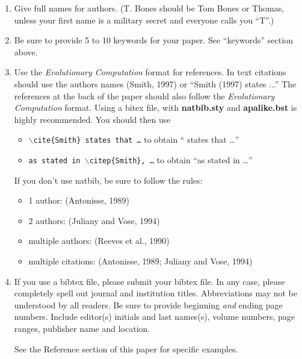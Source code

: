 \documentclass[twoside]{article}
\begin{document}
\begin{enumerate} 
    
\item
Give full names for authors.  (T. Bones should be Tom Bones or Thomas, 
unless your first name is a military secret and everyone calls you ``T''.)  

\item
Be sure to provide 5 to 10 keywords for your paper.  See ``keywords'' 
section above.

\item
Use the {\em Evolutionary Computation} format for references. In text 
citations should use the authors names (Smith, 1997) or ``Smith (1997) 
states ...''   The references at the back of the paper should also follow 
the {\em Evolutionary Computation} format. Using a bitex file, with
{\bf natbib.sty} and {\bf  apalike.bst}  is highly recommended. You
should then use 
\begin{itemize}
\item {\tt $\backslash$cite\{Smith\} states that \ldots} to obtain ``\cite{Smith} states that \ldots''
\item {\tt as stated in  $\backslash$citep\{Smith\}, \ldots} to obtain ``as stated in \citep{Smith} \ldots''
\end{itemize}

If you don't use natbib, be sure to follow the rules:

\begin{itemize}
\item 1 author: (Antonisse, 1989)
\item 2 authors: (Juliany and Vose, 1994)
\item multiple authors: (Reeves et al., 1990)
\item multiple citations: (Antonisse, 1989; Juliany and Vose, 1994) 
\end{itemize}


\item
If you use a bibtex file, please submit your bibtex file. In any case,
please completely 
spell out journal and institution titles.  Abbreviations may not be 
understood by all readers. Be sure to provide beginning {\em and} ending 
page numbers. Include editor(s) initials and last names(s), volume numbers, 
page ranges, publisher name and location.

See the Reference section of this paper for specific examples.

\end{enumerate}
\end{document}
